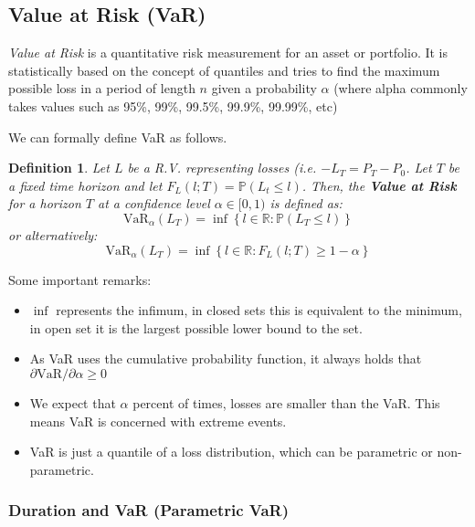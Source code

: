 \documentclass[10pt,letterpaper]{article}
\newtheorem{definition}{Definition}
\begin{document}
\subsection{Value at Risk (VaR)}

\emph{Value at Risk} is a quantitative risk measurement for an asset or portfolio. It is statistically based on the concept of quantiles and tries to find the maximum possible loss in a period of length $n$ given a probability $\alpha$ (where alpha commonly takes values such as 95\%, 99\%, 99.5\%, 99.9\%, 99.99\%, etc)

We can formally define VaR as follows.

\begin{definition}\label{vardef}
Let $L$ be a R.V. representing losses (i.e. $-L_T = P_T - P_0$. Let $T$ be a fixed time horizon and let $F_L(l; T) = \mathbb{P}(L_t\leq l)$. Then, the \emph{\textbf{Value at Risk}} for a horizon $T$ at a confidence level $\alpha\in [0,1)$ is defined as:
\begin{equation}\label{varsettheory}
\mbox{VaR}_\alpha(L_T) = \inf\left\lbrace l \in \mathbb{R}: \mathbb{P}(L_T \leq l)\right\rbrace
\end{equation}
or alternatively:
\begin{equation}\label{varsettheory2}
\mbox{VaR}_\alpha(L_T) = \inf\left\lbrace l \in \mathbb{R}: F_L(l; T)\geq 1 - \alpha\right\rbrace
\end{equation}
\end{definition}

Some important remarks: 
\begin{itemize}
\item $\inf$ represents the infimum, in closed sets this is equivalent to the minimum, in open set it is the largest possible lower bound to the set.
\item As VaR uses the cumulative probability function, it always holds that $\partial\mbox{VaR}/\partial \alpha \geq0$
\item We expect that $\alpha$ percent of times, losses are smaller than the VaR. This means VaR is concerned with extreme events.
\item VaR is just a quantile of a loss distribution, which can be parametric or non-parametric.
\end{itemize}

\subsubsection{Duration and VaR (Parametric VaR)}
\end{document}
